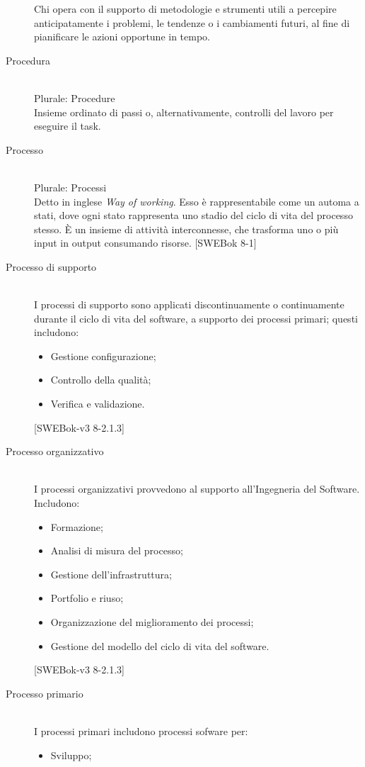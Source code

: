 \begin{description}
Chi opera con il supporto di metodologie e strumenti utili a percepire anticipatamente i problemi, le tendenze o i cambiamenti futuri, al fine di pianificare le azioni opportune in tempo.
 \item[Procedura] \hfill \\
Plurale: Procedure\\ 
Insieme ordinato di passi o, alternativamente, controlli del lavoro per eseguire il task.
 \item[Processo] \hfill \\
Plurale: Processi\\ 
Detto in inglese \textit{Way of working}. Esso è
		rappresentabile come un automa a stati, dove ogni stato rappresenta uno
		stadio del ciclo di vita del processo stesso. È un insieme di attività interconnesse, che trasforma uno o più input in output consumando risorse. [SWEBok 8-1]
 \item[Processo di supporto] \hfill \\
I processi di supporto sono applicati discontinuamente o continuamente durante il ciclo di vita del software, a supporto dei processi primari; questi includono:\begin{itemize}
\item Gestione configurazione;
\item Controllo della qualit\`a;
\item Verifica e validazione.
\end{itemize}
[SWEBok-v3 8-2.1.3]
 \item[Processo organizzativo] \hfill \\
I processi organizzativi provvedono al supporto all'Ingegneria del Software. Includono: \begin{itemize}
\item Formazione;
\item Analisi di misura del processo;
\item Gestione dell'infrastruttura;
\item Portfolio e riuso;
\item Organizzazione del miglioramento dei processi;
\item Gestione del modello del ciclo di vita del software.
\end{itemize}
[SWEBok-v3 8-2.1.3]
 \item[Processo primario] \hfill \\
I processi primari includono processi sofware per: \begin{itemize}
\item Sviluppo;

\end{itemize}
\end{description}
